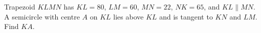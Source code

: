 Trapezoid $ KLMN $ has $ KL=80 $, $ LM=60 $, $ MN=22 $, $ NK=65 $, and $ KL\parallel MN $. A semicircle with centre $ A $ on $ KL $ lies above $ KL $ and is tangent to $ KN $ and $ LM $. Find $ KA $.
